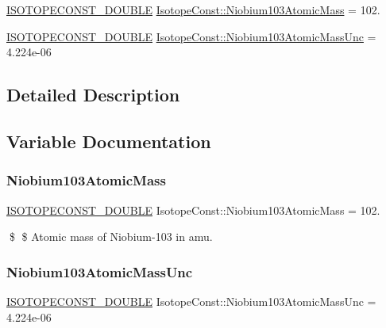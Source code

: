 \begin{DoxyCompactItemize}
\item 
\mbox{\hyperlink{group___isotope_const-_macros_ga8f45a7272ce02c0b4c65c44636ed719a}{I\+S\+O\+T\+O\+P\+E\+C\+O\+N\+S\+T\+\_\+\+D\+O\+U\+B\+LE}} \mbox{\hyperlink{group___isotope_const-_niobium-_nb103_gae2892bfabf2c1da9b219d0dd8a679ab7}{Isotope\+Const\+::\+Niobium103\+Atomic\+Mass}} = 102.
\item 
\mbox{\hyperlink{group___isotope_const-_macros_ga8f45a7272ce02c0b4c65c44636ed719a}{I\+S\+O\+T\+O\+P\+E\+C\+O\+N\+S\+T\+\_\+\+D\+O\+U\+B\+LE}} \mbox{\hyperlink{group___isotope_const-_niobium-_nb103_gadfba92e94a6adefdbf8d52b5eef1603d}{Isotope\+Const\+::\+Niobium103\+Atomic\+Mass\+Unc}} = 4.\+224e-\/06
\end{DoxyCompactItemize}


\subsection{Detailed Description}


\subsection{Variable Documentation}
\mbox{\label{group___isotope_const-_niobium-_nb103_gae2892bfabf2c1da9b219d0dd8a679ab7}} 
\subsubsection{\texorpdfstring{Niobium103\+Atomic\+Mass}{Niobium103AtomicMass}}
{\footnotesize\ttfamily \mbox{\hyperlink{group___isotope_const-_macros_ga8f45a7272ce02c0b4c65c44636ed719a}{I\+S\+O\+T\+O\+P\+E\+C\+O\+N\+S\+T\+\_\+\+D\+O\+U\+B\+LE}} Isotope\+Const\+::\+Niobium103\+Atomic\+Mass = 102.}

\$ \$ Atomic mass of Niobium-\/103 in amu. \mbox{\label{group___isotope_const-_niobium-_nb103_gadfba92e94a6adefdbf8d52b5eef1603d}} 
\subsubsection{\texorpdfstring{Niobium103\+Atomic\+Mass\+Unc}{Niobium103AtomicMassUnc}}
{\footnotesize\ttfamily \mbox{\hyperlink{group___isotope_const-_macros_ga8f45a7272ce02c0b4c65c44636ed719a}{I\+S\+O\+T\+O\+P\+E\+C\+O\+N\+S\+T\+\_\+\+D\+O\+U\+B\+LE}} Isotope\+Const\+::\+Niobium103\+Atomic\+Mass\+Unc = 4.\+224e-\/06}

